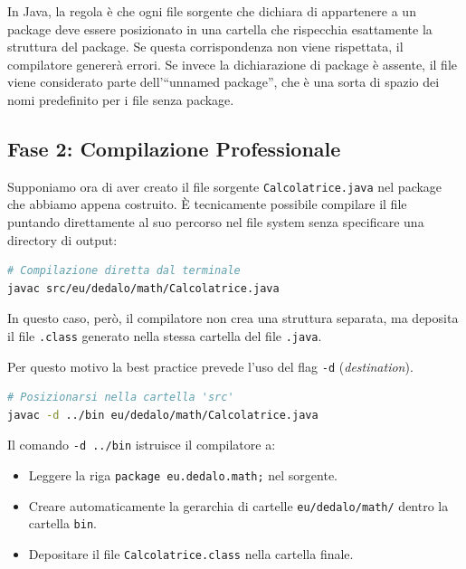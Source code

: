 \vspace{\baselineskip}

In Java, la regola è che ogni file sorgente che dichiara di appartenere a un package deve essere posizionato in una cartella che rispecchia esattamente la struttura del package. Se questa corrispondenza non viene rispettata, il compilatore genererà errori. Se invece la dichiarazione di package è assente, il file viene considerato parte dell'``unnamed package'', che è una sorta di spazio dei nomi predefinito per i file senza package.


\subsection*{Fase 2: Compilazione Professionale}

Supponiamo ora di aver creato il file sorgente \texttt{Calcolatrice.java} nel package che abbiamo appena costruito. È tecnicamente possibile compilare il file puntando direttamente al suo percorso nel file system senza specificare una directory di output:

\begin{lstlisting}[language=bash]
# Compilazione diretta dal terminale
javac src/eu/dedalo/math/Calcolatrice.java
\end{lstlisting}

In questo caso, però, il compilatore non crea una struttura separata, ma deposita il file \texttt{.class} generato nella stessa cartella del file \texttt{.java}. 

Per questo motivo la best practice prevede l'uso del flag \texttt{-d} (\textit{destination}).

\begin{lstlisting}[language=bash, caption={Compilazione da terminale}]
# Posizionarsi nella cartella 'src'
javac -d ../bin eu/dedalo/math/Calcolatrice.java
\end{lstlisting}

Il comando \texttt{-d ../bin} istruisce il compilatore a:
\begin{itemize}
    \item Leggere la riga \texttt{package eu.dedalo.math;} nel sorgente.
    \item Creare automaticamente la gerarchia di cartelle \texttt{eu/dedalo/math/} dentro la cartella \texttt{bin}.
    \item Depositare il file \texttt{Calcolatrice.class} nella cartella finale.
\end{itemize}


